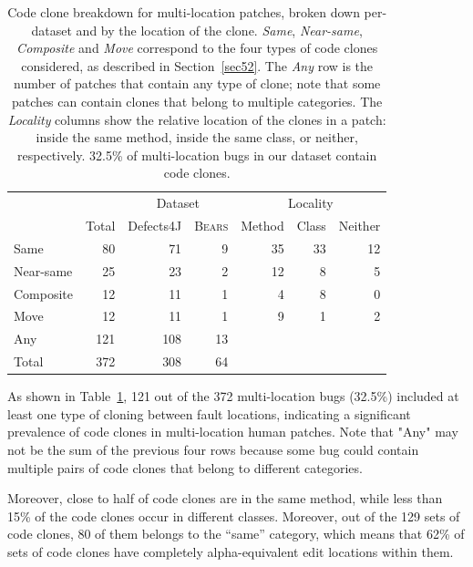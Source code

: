 \documentclass[10pt, conference]{IEEEtran}
\newcommand\bears{\textsc{Bears}\xspace}
\begin{document}
\begin{table}
{\begin{center}
\begin{tabular} {lrrrrrr}
\toprule
&&\multicolumn{2}{c}{Dataset} &\multicolumn{3}{c}{Locality}\\
& Total & Defects4J & \bears & Method & Class & Neither\\
\midrule
Same      &  80 &  71 & 9 & 35 & 33 & 12 \\
Near-same   &  25 &  23 & 2 & 12 &  8 &  5 \\
Composite &  12 &  11 & 1 &  4 &  8 &  0 \\
Move      &  12 &  11 & 1 &  9 &  1 &  2 \\
\midrule
Any       & 121 & 108 & 13\\
Total     & 372 & 308 & 64\\
\bottomrule
\end{tabular}
\end{center}
}
\caption{Code clone breakdown for multi-location patches, broken down
  per-dataset and by the location of the clone. \emph{Same}, \emph{Near-same},
  \emph{Composite} and \emph{Move} correspond to the four types of code clones
  considered, as described in Section~\ref{sec52}.  The \emph{Any} row is the
  number of patches that contain any type of clone; note that some patches can
  contain clones that belong to multiple categories. The \emph{Locality} columns
  show the relative location of the clones in a patch: inside the same method,
  inside the same class, or neither, respectively. 32.5\% of multi-location bugs
  in our dataset contain code clones.}
\label{tab:clones}
\end{table}

As shown in Table~\ref{tab:clones}, 121 out of the 372 multi-location bugs
(32.5\%) included at least one type of cloning between fault locations,
indicating a significant prevalence of code clones in multi-location human
patches.  Note that "Any" may not be the sum of the previous four rows because
some bug could contain multiple pairs of code clones that belong to different
categories.

Moreover, close to half of code clones are in the same method, while less than
15\% of the code clones occur in different classes. Moreover, out of the 129 sets of code clones,
80 of them belongs to the ``same'' category, which means that 62\% of sets of code clones have completely
alpha-equivalent edit locations within them.
\end{document}
